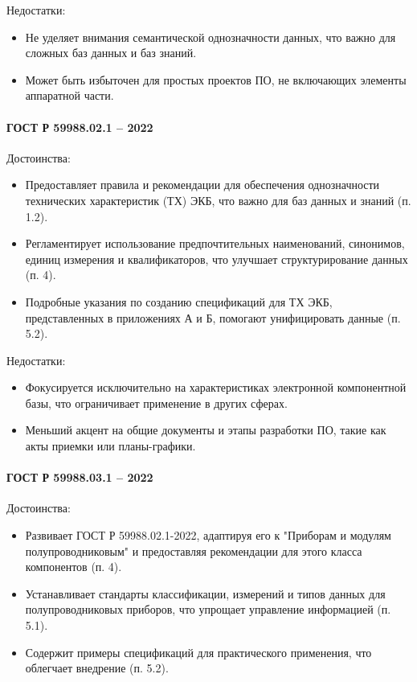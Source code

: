 Недостатки:

\begin{itemize}
	\item Не уделяет внимания семантической однозначности данных,
		что важно для сложных баз данных и баз знаний.
	\item Может быть избыточен для простых проектов ПО,
		не включающих элементы аппаратной части.
\end{itemize}

\paragraph{ГОСТ Р 59988.02.1 -- 2022}

Достоинства:

\begin{itemize}
	\item Предоставляет правила
		и рекомендации для обеспечения однозначности
		технических характеристик (ТХ) ЭКБ,
		что важно для баз данных и знаний (п. 1.2).
	\item Регламентирует использование предпочтительных наименований,
		синонимов, единиц измерения и квалификаторов,
		что улучшает структурирование данных (п. 4).
	\item Подробные указания по созданию спецификаций для ТХ ЭКБ,
		представленных в приложениях А и Б,
		помогают унифицировать данные (п. 5.2).
\end{itemize}

Недостатки:

\begin{itemize}
	\item Фокусируется исключительно на характеристиках
		электронной компонентной базы,
		что ограничивает применение в других сферах.
	\item Меньший акцент на общие документы и этапы разработки ПО,
		такие как акты приемки или планы-графики.
\end{itemize}

\paragraph{ГОСТ Р 59988.03.1 -- 2022}

Достоинства:

\begin{itemize}
	\item Развивает ГОСТ Р 59988.02.1-2022,
		адаптируя его к "Приборам и модулям полупроводниковым"
		и предоставляя рекомендации для этого класса компонентов (п. 4).
	\item Устанавливает стандарты классификации,
		измерений и типов данных для полупроводниковых приборов,
		что упрощает управление информацией (п. 5.1).
	\item Содержит примеры спецификаций для практического применения,
		что облегчает внедрение (п. 5.2).
\end{itemize}

